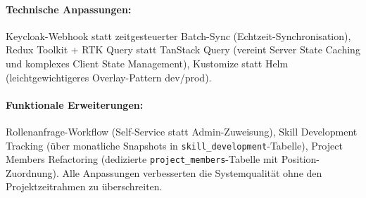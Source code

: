 \paragraph{Technische Anpassungen:}
Keycloak-Webhook statt zeitgesteuerter Batch-Sync (Echtzeit-Synchronisation), Redux Toolkit + RTK Query statt TanStack Query (vereint Server State Caching und komplexes Client State Management\cite{redux_toolkit}), Kustomize statt Helm (leichtgewichtigeres Overlay-Pattern dev/prod).

\paragraph{Funktionale Erweiterungen:}
Rollenanfrage-Workflow (Self-Service statt Admin-Zuweisung), Skill Development Tracking (über monatliche Snapshots in \texttt{skill\_development}-Tabelle), Project Members Refactoring (dedizierte \texttt{project\_members}-Tabelle mit Position-Zuordnung). Alle Anpassungen verbesserten die Systemqualität ohne den Projektzeitrahmen zu überschreiten.
